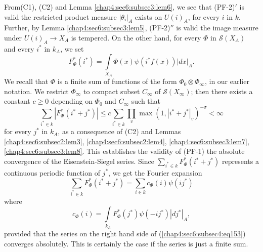 From\pageoriginale (C1), (C2) and Lemma \ref{chap4:sec6:subsec3:lem6},
we see that 
(PF-2)$'$ is valid \ie the restricted product measure
$|\theta_{i}|_{A}$ exists on $U(i)_{A}$, for every $i$ in
$k$. Further, by Lemma \ref{chap4:sec6:subsec3:lem5}, (PF-2)$''$ is
valid \ie the image 
measure under $U(i)_{A}\to X_{A}$ is tempered. On the other hand, for
every $\Phi$ in $\mathscr{S}(X_{A})$ and every $i^{\ast}$ in $k_{A}$, we
set
$$
F^{\ast}_{\Phi}(i^{\ast})=\int\limits_{X_{A}}\Phi(x)\psi(i^{\ast}f(x))|dx|_{A}.
$$
We recall that $\Phi$ is a finite sum of functions of the form
$\Phi_{0}\otimes \Phi_{\infty}$, in our earlier notation. We restrict
$\Phi_{\infty}$ to compact subset $C_{\infty}$ of
$\mathscr{S}(X_{\infty})$; then there exists a constant $c\geq 0$
depending on $\Phi_{0}$ and $C_{\infty}$ such that
$$
\sum_{i^{\ast}\in k}|F^{\ast}_{\Phi}(i^{\ast}+j^{\ast})|\leq
c\sum_{i^{\ast}\in
  k}\prod_{v}\max(1,|i^{\ast}+j^{\ast}|_{v})^{-\sigma}<\infty
$$
for every $j^{\ast}$ in $k_{A}$, as a consequence of (C2) and Lemmas
\ref{chap4:sec6:subsec2:lem3},
\ref{chap4:sec6:subsec2:lem4}, \ref{chap4:sec6:subsec3:lem7},
\ref{chap4:sec6:subsec3:lem8}. This 
establishes the validity of (PF-1) \ie the absolute convergence of the
Eisenstein-Siegel series. Since $\sum\limits_{i^{\ast}\in
  k}F^{\ast}_{\Phi}(i^{\ast}+j^{\ast})$ represents a continuous
periodic function of $j^{\ast}$, we get the Fourier expansion
\begin{equation*}
\sum_{i^{\ast}\in k}F^{\ast}_{\Phi}(i^{\ast}+j^{\ast})=\sum_{i\in
  k}c_{\Phi}(i)\psi(ij^{\ast})\tag{153}\label{chap4:sec6:subsec4:eq153}
\end{equation*}
where 
$$
c_{\Phi}(i)=\int\limits_{k_{A}}F^{\ast}_{\Phi}(j^{\ast})
\psi(-ij^{\ast})|dj^{\ast}|_{A},  
$$
provided that the series on the right hand side of
(\ref{chap4:sec6:subsec4:eq153})
converges absolutely. This is certainly the case if the series is just
a finite sum.

